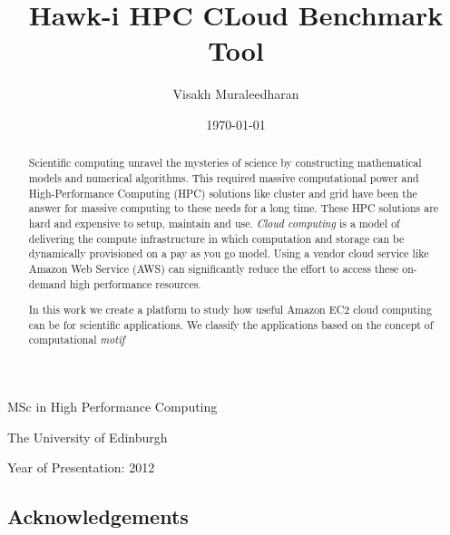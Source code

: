 \documentclass[12pt,a4paper]{report}
\begin{document}




\title{Hawk-i HPC CLoud Benchmark Tool}
\author{Visakh Muraleedharan}
\date{\today}

\makeEPCCtitle

\thispagestyle{empty}

\vspace{12cm}

\begin{center}

\large{MSc in High Performance Computing}

\large{The University of Edinburgh}

\large{Year of Presentation: 2012}

\end{center}

\newpage

\begin{abstract}
Scientific computing unravel the mysteries of science by constructing mathematical models and numerical algorithms. 
This required massive computational power and High-Performance Computing (HPC) solutions like cluster and grid have been the answer for massive computing to these needs for a long time.
These HPC solutions are hard and expensive to setup, maintain and use. 
\emph{Cloud computing} is a model of delivering the compute infrastructure in which 
computation and storage can be dynamically provisioned on a pay as you go model. 
Using a vendor cloud service like Amazon Web Service (AWS) can significantly reduce the effort to access these on-demand high performance resources.

In this work we create a platform to study how useful Amazon EC2 cloud computing can be for scientific applications. 
We classify the applications based on the concept of computational \emph{motif}\cite{asanovic2008parallel}  
\end{abstract}


\tableofcontents
\listoftables
\listoffigures

\begin{titlepage}
\vspace*{2in}
\section*{Acknowledgements}

\end{titlepage}
\end{document}
